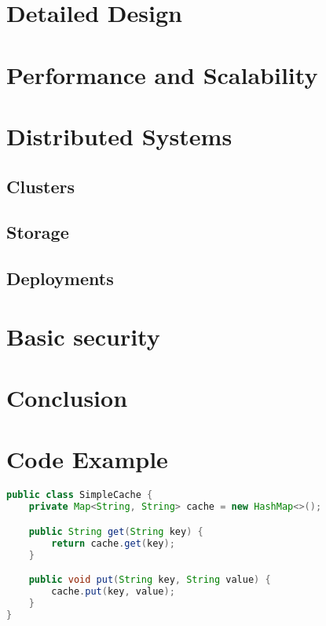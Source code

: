 \documentclass[a4paper, 11pt]{book}
\begin{document}


    \section{Detailed Design}
    \lipsum[5]



    \section{Performance and Scalability}
    \lipsum[6]



    \section{Distributed Systems}
    \subsection{Clusters}
    \subsection{Storage}
    \subsection{Deployments}

    \lipsum[7]

    \section{Basic security}
    \lipsum[7]

    \section{Conclusion}
    \lipsum[7]

    \newpage



    \section{Code Example}
    \begin{lstlisting}[language=Java, caption=Java Code for a Simple Cache]
public class SimpleCache {
    private Map<String, String> cache = new HashMap<>();

    public String get(String key) {
        return cache.get(key);
    }

    public void put(String key, String value) {
        cache.put(key, value);
    }
}
    \end{lstlisting}
\end{document}
